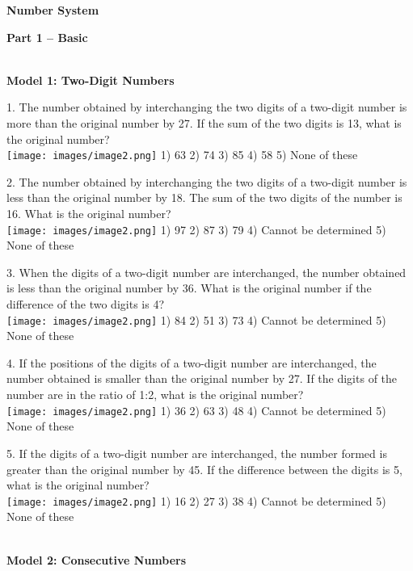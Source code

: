 \documentclass[
]{article}
\author{}
\date{}
\begin{document}
	
 

\begin{center}
	{\Large \textbf{Number System \\}}
\end{center}

{\large \textbf{Part 1 – Basic  \\}}

\textbf{ \\ Model 1: Two-Digit Numbers \\ }

1. The number obtained by interchanging the two digits of a two-digit number is more than the original number by 27. If the sum of the two digits is 13, what is the original number? \\
\texttt{[image: images/image2.png]} 1) 63 	2) 74 	3) 85 	4) 58 	5) None of these

2. The number obtained by interchanging the two digits of a two-digit number is less than the original number by 18. The sum of the two digits of the number is 16. What is the original number?\\
\texttt{[image: images/image2.png]} 1) 97 	2) 87 	3) 79 4) Cannot be determined 	5) None of these
	
3. When the digits of a two-digit number are interchanged, the number obtained is less than the original number by 36. What is the original number if the difference of the two digits is 4? \\
\texttt{[image: images/image2.png]} 1) 84 	2) 51 	3) 73 4) Cannot be determined 	5) None of these

4. If the positions of the digits of a two-digit number are interchanged, the number obtained is smaller than the original number by 27. If the digits of the number are in the ratio of 1:2, what is the original number?\\
\texttt{[image: images/image2.png]} 1) 36 2) 63 3) 48 4) Cannot be determined 5) None of these

5. If the digits of a two-digit number are interchanged, the number formed is greater than the original number by 45. If the difference between the digits is 5, what is the original number?\\
\texttt{[image: images/image2.png]} 1) 16 2) 27 3) 38 4) Cannot be determined 5) None of these

\textbf{ \\ Model 2: Consecutive Numbers \\ }
\end{document}
